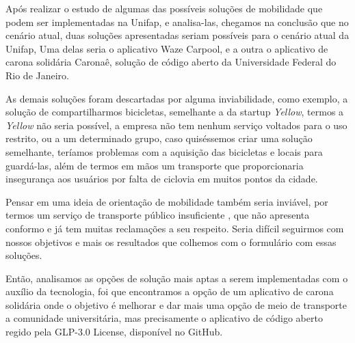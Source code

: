  %

Após realizar o estudo de algumas das possíveis soluções de mobilidade que podem ser implementadas na Unifap, e analisa-las, chegamos na conclusão que no cenário atual, duas soluções apresentadas seriam possíveis para o cenário atual da Unifap, Uma delas seria o aplicativo Waze Carpool, e a outra o aplicativo de carona solidária Caronaê, solução de código aberto da Universidade Federal do Rio de Janeiro.

As demais soluções foram descartadas por alguma inviabilidade, como exemplo, a solução de compartilharmos bicicletas, semelhante a da startup \textit{Yellow}, termos a \textit{Yellow} não seria possível, a empresa não tem nenhum serviço voltados para o uso restrito, ou a um determinado grupo, caso quiséssemos criar uma solução semelhante, teríamos problemas com a aquisição das bicicletas e locais para guardá-las, além de termos em mãos um transporte que proporcionaria insegurança aos usuários por falta de ciclovia em muitos pontos da cidade.

Pensar em uma ideia de orientação de mobilidade também seria inviável, por termos um serviço de transporte público insuficiente \cite{sau2018}, que não apresenta conformo e já tem muitas reclamações a seu respeito. Seria difícil seguirmos com nossos objetivos e mais os resultados que colhemos com o formulário com essas soluções.

Então, analisamos as opções de solução mais aptas a serem implementadas com o auxílio da tecnologia, foi que encontramos a opção de um aplicativo de carona solidária onde o objetivo é melhorar e dar mais uma opção de meio de transporte a comunidade universitária, mas precisamente o aplicativo de código aberto regido pela GLP-3.0 License, disponível no GitHub.

